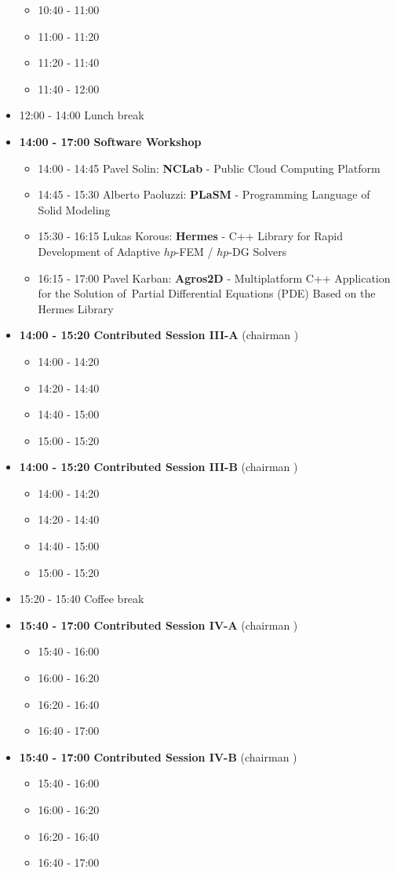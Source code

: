 \documentclass[10pt, A4]{article}%
\begin{document}
\begin{itemize}
  \begin{itemize}
    \item 10:40 - 11:00
    \item 11:00 - 11:20 
    \item 11:20 - 11:40 
    \item 11:40 - 12:00 
  \end{itemize}
  \item 12:00 - 14:00 Lunch break
  \item {\bf 14:00 - 17:00 Software Workshop}
  \begin{itemize}
    \item 14:00 - 14:45 Pavel Solin: {\bf NCLab} - Public Cloud Computing Platform
    \item 14:45 - 15:30 Alberto Paoluzzi: {\bf PLaSM} - Programming Language of Solid Modeling
    \item 15:30 - 16:15 Lukas Korous: {\bf Hermes} - C++ Library for Rapid Development of Adaptive $hp$-FEM / $hp$-DG Solvers
    \item 16:15 - 17:00 Pavel Karban: {\bf Agros2D} - Multiplatform C++ Application for the Solution of~Partial Differential Equations (PDE) Based on the Hermes Library  
  \end{itemize}
  \item {\bf 14:00 - 15:20 Contributed Session III-A} (chairman ) 
  \begin{itemize}
    \item 14:00 - 14:20 
    \item 14:20 - 14:40 
    \item 14:40 - 15:00
    \item 15:00 - 15:20  
  \end{itemize}
  \item {\bf 14:00 - 15:20 Contributed Session III-B} (chairman ) 
  \begin{itemize}
    \item 14:00 - 14:20 
    \item 14:20 - 14:40 
    \item 14:40 - 15:00
    \item 15:00 - 15:20  
  \end{itemize}
  \item 15:20 - 15:40 Coffee break
  \item {\bf 15:40 - 17:00 Contributed Session IV-A} (chairman ) 
  \begin{itemize}
    \item 15:40 - 16:00
    \item 16:00 - 16:20 
    \item 16:20 - 16:40 
    \item 16:40 - 17:00
  \end{itemize}
  \item {\bf 15:40 - 17:00 Contributed Session IV-B} (chairman ) 
  \begin{itemize}
    \item 15:40 - 16:00
    \item 16:00 - 16:20 
    \item 16:20 - 16:40 
    \item 16:40 - 17:00
  \end{itemize}  
\end{itemize}
\end{document}
